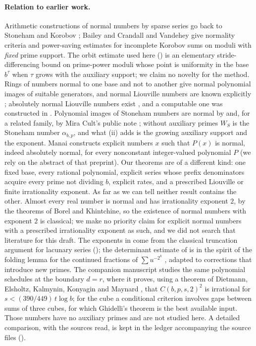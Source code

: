 \documentclass[11pt]{article}
\begin{document}
\paragraph{Relation to earlier work.} Arithmetic constructions of normal numbers by sparse series go back to
Stoneham \cite{Stoneham73} and Korobov \cite{Korobov72}; Bailey and Crandall \cite[Theorem~4.8]{BC02} and Vandehey
\cite[Corollary~1.2 and Theorem~7.4]{Vandehey19} give normality criteria and power-saving estimates for incomplete
Korobov sums on moduli with \emph{fixed} prime support. The orbit estimate used here ()
is an elementary stride-differencing bound on prime-power moduli whose point is uniformity in the base
$b^\tau$ when $\tau$ grows with the auxiliary support; we claim no novelty for the method. Rings of numbers normal to
one base and not to another \cite{KS93} give normal polynomial images of suitable generators, and normal Liouville
numbers are known explicitly \cite{KS93,BC02}; absolutely normal Liouville numbers exist \cite{Bugeaud02}, and a
computable one was constructed in \cite{BHS15}. Polynomial images of Stoneham numbers are normal by
\cite[Theorem~A]{PaperIv2} and, for a related family, by Mira Cult's public note \cite[Theorem~1.1]{MiraPoly};
without auxiliary primes $W_S$ is the Stoneham number $\alpha_{b,p}$, and what (ii) adds is the growing
auxiliary support and the exponent. Manai \cite{Manai25} constructs explicit numbers $x$ such that $P(x)$ is normal,
indeed absolutely normal, for every nonconstant integer-valued polynomial $P$ (we rely on the abstract of that
preprint). Our theorems are of a different kind: one fixed base, every rational polynomial, explicit series whose
prefix denominators acquire every prime not dividing $b$, explicit rates, and a prescribed Liouville or finite
irrationality exponent. As far as we can tell neither result contains the other. Almost every real number is
normal and has irrationality exponent $2$, by the theorems of Borel and Khintchine, so the existence of normal
numbers with exponent $2$ is classical; we make no priority claim for explicit normal numbers with a prescribed
irrationality exponent as such, and we did not search that literature for this draft. The exponents in
 come from the classical truncation argument for lacunary series (); the
determinant estimate of  is in the spirit of the folding lemma for the continued fractions of
$\sum u^{-2^k}$ \cite{Shallit79,vdPS92}, adapted to corrections that introduce new primes. The companion manuscript
\cite{PaperVIIv2} studies the same polynomial schedules at the boundary $d=r$, where it proves, using a theorem of
Dietmann, Elsholtz, Kalmynin, Konyagin and Maynard \cite[Theorem~1]{DEKKM}, that $C(b,p,s,2)^2$ is irrational for
$s<(390/449)\,t\log b$; for the cube a conditional criterion involves gaps between sums of three cubes, for which
Ghidelli's theorem \cite[Theorem~1.1]{Ghidelli20} is the best available input. Those numbers have no auxiliary
primes and are not studied here. A detailed comparison, with the sources read, is kept in the ledger accompanying
the source files ().
\end{document}
